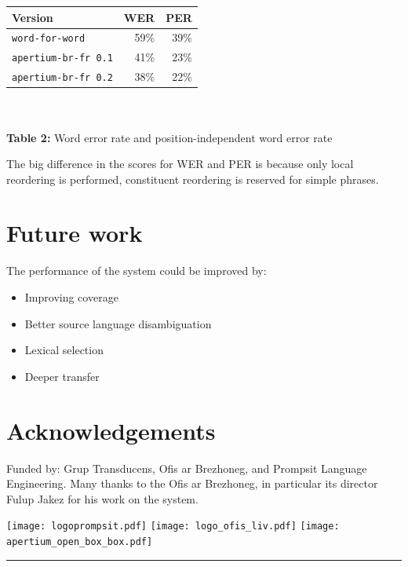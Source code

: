 \documentclass[a0,landscape]{a0poster}
\begin{document}
\begin{multicols}{4}
  \begin{center}
  \begin{tabular}{l|r|r}
   \hline
   {\bf Version }   & {\bf WER}  & {\bf PER}  \\
   \hline 
   \texttt{{\small word-for-word}} & 59\% & 39\% \\
   \texttt{{\small apertium-br-fr 0.1}}        & 41\% & 23\% \\
   \texttt{{\small apertium-br-fr 0.2}}        & 38\% & 22\% \\
   \hline
  \end{tabular}\\
~\\
    \textbf{Table 2:} Word error rate and position-independent word error rate 
  \end{center}
\vspace{0.5cm}
The big difference in the scores for WER and PER is because only 
local reordering is performed, constituent reordering is reserved for simple phrases.

\section{Future work}

\noindent
The performance of the system could be improved by:

\begin{itemize}
  \item Improving coverage 
  \item Better source language disambiguation
  \item Lexical selection
  \item Deeper transfer
\end{itemize}

\section*{Acknowledgements}

\noindent
Funded by: Grup Transducens, Ofis ar Brezhoneg, and Prompsit Language Engineering.
Many thanks to the Ofis ar Brezhoneg, in particular its director Fulup Jakez for his
work on the system. 

\flushright
\begin{minipage}[b]{0.8\linewidth}
\texttt{[image: logoprompsit.pdf]}\hspace{0.8cm}
\texttt{[image: logo\_ofis\_liv.pdf]}\hspace{0.5cm}
\texttt{[image: apertium\_open\_box\_box.pdf]}
\end{minipage}

\vskip 0.1cm
\hrule
\vskip 0.1cm

\end{multicols}
\end{document}
